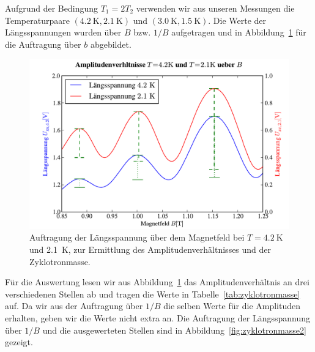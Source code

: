\documentclass[paper=a4,fontsize=10pt,DIV=18,twocolumn,parskip=half]{scrartcl}
\numberwithin{equation}{section}    %
\begin{document}
Aufgrund der Bedingung $T_{1}=2T_{2}$ verwenden wir aus unseren Messungen die Temperaturpaare $(\SI{4.2}{\kelvin},\SI{2.1}{\kelvin})$ und $(\SI{3.0}{\kelvin},\SI{1.5}{\kelvin})$. Die Werte der Längsspannungen wurden über $B$ bzw. $1/B$ aufgetragen und in Abbildung~\ref{fig:zyklotronmasse} für die Auftragung über $b$ abgebildet.
\begin{figure}[htp]
	\begin{center}
		\includegraphics[width=\columnwidth]{Data-Plots/11-4,2-2,1-zyklotron-B.pdf}
		\caption{Auftragung der Längsspannung über dem Magnetfeld bei $T=\SI{4.2}{\kelvin}$ und \SI{2.1}{\kelvin}, zur Ermittlung des Amplitudenverhältnisses und der Zyklotronmasse.}
		\label{fig:zyklotronmasse}
	\end{center}
\end{figure}
Für die Auswertung lesen wir aus Abbildung~\ref{fig:zyklotronmasse} das Amplitudenverhältnis an drei verschiedenen Stellen ab und tragen die Werte in Tabelle~\ref{tab:zyklotronmasse} auf. Da wir aus der Auftragung über $1/B$ die selben Werte für die Amplituden erhalten, geben wir die Werte nicht extra an. Die Auftragung der Längsspannung über $1/B$ und die ausgewerteten Stellen sind in Abbildung~\ref{fig:zyklotronmasse2} gezeigt.
\end{document}
